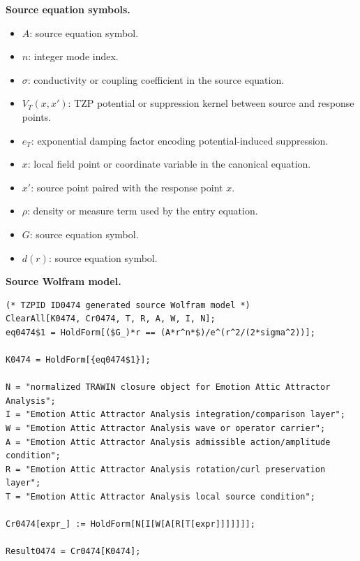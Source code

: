 \begin{minipage}[t]{0.49\linewidth}
\begingroup
\small
\raggedright
\textbf{Source equation symbols.}\par
\begin{itemize}[leftmargin=1.35em,itemsep=1pt,topsep=1pt,parsep=0pt]
    \item $A$: source equation symbol.
    \item $n$: integer mode index.
    \item $\sigma$: conductivity or coupling coefficient in the source equation.
    \item $V_{T}(x,x')$: TZP potential or suppression kernel between source and response points.
    \item $e_T$: exponential damping factor encoding potential-induced suppression.
    \item $x$: local field point or coordinate variable in the canonical equation.
    \item $x'$: source point paired with the response point $x$.
    \item $\rho$: density or measure term used by the entry equation.
    \item $G$: source equation symbol.
    \item $d(r)$: source equation symbol.
\end{itemize}
\endgroup
\end{minipage}\hfill
\begin{minipage}[t]{0.47\linewidth}
\begingroup
\scriptsize
\raggedright
\textbf{Source Wolfram model.}\par
\begin{Verbatim}[fontsize=\tiny,breaklines=true,breakanywhere=true]
(* TZPID ID0474 generated source Wolfram model *)
ClearAll[K0474, Cr0474, T, R, A, W, I, N];
eq0474$1 = HoldForm[($G_)*r == (A*r^n*$)/e^(r^2/(2*sigma^2))];

K0474 = HoldForm[{eq0474$1}];

N = "normalized TRAWIN closure object for Emotion Attic Attractor Analysis";
I = "Emotion Attic Attractor Analysis integration/comparison layer";
W = "Emotion Attic Attractor Analysis wave or operator carrier";
A = "Emotion Attic Attractor Analysis admissible action/amplitude condition";
R = "Emotion Attic Attractor Analysis rotation/curl preservation layer";
T = "Emotion Attic Attractor Analysis local source condition";

Cr0474[expr_] := HoldForm[N[I[W[A[R[T[expr]]]]]]];

Result0474 = Cr0474[K0474];
\end{Verbatim}
\endgroup
\end{minipage}

